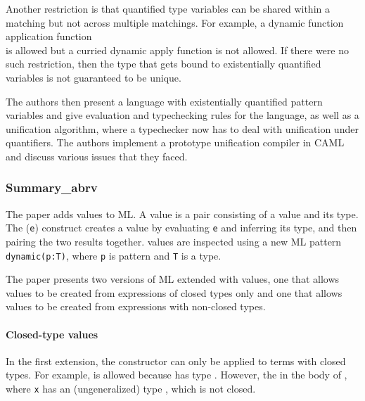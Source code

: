 \documentclass[12pt]{article}	%
\begin{document}
Another restriction is that quantified type variables can be shared within a matching but not across multiple matchings. For example, a dynamic function application function \\  is allowed but a curried dynamic apply function  is not allowed. If there were no such restriction, then the type that gets bound to existentially quantified variables is not guaranteed to be unique.

The authors then present a language with existentially quantified pattern variables and give evaluation and typechecking rules for the language, as well as a unification algorithm, where a typechecker now has to deal with unification under quantifiers. The authors implement a prototype unification compiler in CAML and discuss various issues that they faced.



\subsubsection*{Summary\_abrv}
The paper adds \Dynamic values to ML. A \Dynamic value is a pair consisting of a value and its type. The (\dynamic \texttt{e}) construct creates a \Dynamic value by evaluating \texttt{e} and inferring its type, and then pairing the two results together. \Dynamic values are inspected using a new ML pattern \texttt{dynamic(p:T)}, where \texttt{p} is pattern and \texttt{T} is a type.

The paper presents two versions of ML extended with \Dynamic values, one that allows \Dynamic values to be created from expressions of closed types only and one that allows \Dynamic values to be created from expressions with non-closed types.

\paragraph{Closed-type \Dynamic values}
In the first extension, the \dynamic constructor can only be applied to terms with closed types. For example,  is allowed because  has type . However, the \dynamic in the body of , where \texttt{x} has an (ungeneralized) type \mlcode{\alpha}, which is not closed. 
\end{document}

